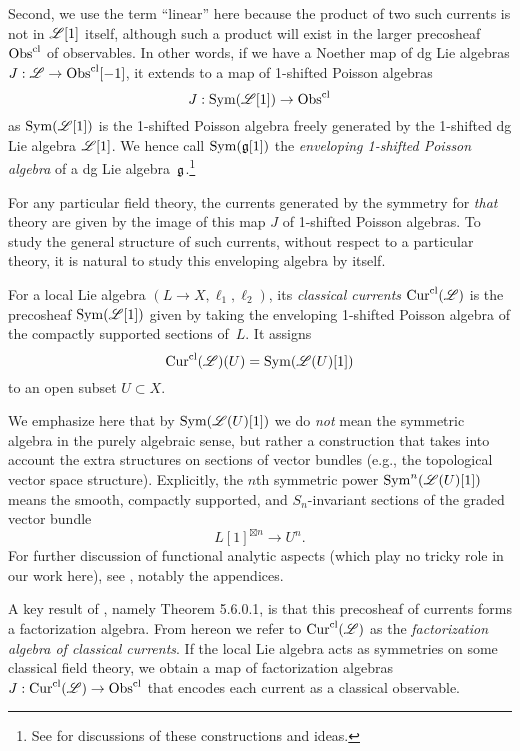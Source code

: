 Second, we use the term ``linear'' here because the product of two such currents is not in $\mathscr L[1]$ itself, 
although such a product will exist in the larger precosheaf ${\rm Obs}^{\rm cl}$ of observables.
In other words, if we have a Noether map of dg Lie algebras $J: \mathscr L \to {\rm Obs}^{\rm cl}[-1]$,
it extends to a map of 1-shifted Poisson algebras
\[
J: {\rm Sym}(\mathscr L[1]) \to {\rm Obs}^{\rm cl}
\]
as ${\rm Sym}(\mathscr L[1])$ is the 1-shifted Poisson algebra freely generated by the 1-shifted dg Lie algebra $\mathscr L[1]$.
We hence call ${\rm Sym}(\mathfrak g[1])$ the {\em enveloping 1-shifted Poisson algebra} of a dg Lie algebra~$\mathfrak g$.\footnote{See \cite{BashVor, BrLaz, GwHaug} for discussions of these constructions and ideas.}

For any particular field theory, the currents generated by the symmetry for {\em that} theory are given by the image of this map $J$ of 1-shifted Poisson algebras.
To study the general structure of such currents, without respect to a particular theory,
it is natural to study this enveloping algebra by itself.

\begin{dfn}\label{dfn: classical currents}
For a local Lie algebra $(L\to X, \ell_1,\ell_2)$, its {\em classical currents} ${\rm Cur}^{\rm cl}(\mathscr L)$ is the precosheaf ${\rm Sym}(\mathscr L[1])$ given by taking the enveloping 1-shifted Poisson algebra of the compactly supported sections of~$L$.
It assigns
\[
{\rm Cur}^{\rm cl}(\mathscr L)(U) = {\rm Sym}(\mathscr L(U)[1])
\]
to an open subset $U \subset X$. 
\end{dfn}

We emphasize here that by ${\rm Sym}(\mathscr L(U)[1])$ we do {\em not} mean the symmetric algebra in the purely algebraic sense, but rather a construction that takes into account the extra structures on sections of vector bundles (e.g., the topological vector space structure).
Explicitly, the $n$th symmetric power  ${\rm Sym}^n(\mathscr L(U)[1])$ means the smooth, compactly supported, and $S_n$-invariant sections of the graded vector bundle 
\[
L[1]^{\boxtimes n} \to U^n.
\]
For further discussion of functional analytic aspects (which play no tricky role in our work here),
see \cite{CG1}, notably the appendices.

A key result of \cite{CG1}, namely Theorem 5.6.0.1, is that this precosheaf of currents forms a factorization algebra. 
From hereon we refer to  ${\rm Cur}^{\rm cl}(\mathscr L)$ as the {\em factorization algebra of classical currents}.
If the local Lie algebra acts as symmetries on some classical field theory,
we obtain a map of factorization algebras $J: {\rm Cur}^{\rm cl}(\mathscr L) \to {\rm Obs}^{\rm cl}$ that encodes each current as a classical observable.

